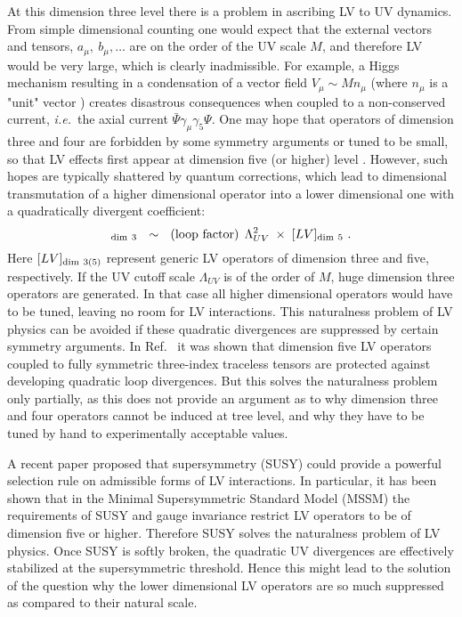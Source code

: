 \documentclass[12pt]{revtex4}
\begin{document}
At this dimension three level there is a problem in ascribing LV to UV
dynamics. From simple dimensional counting  one would expect that the
external vectors and tensors, $a_\mu,~b_\mu,\ldots$ are on the order
of the UV scale $M$, and therefore LV would be very large, which is clearly
inadmissible. For example, a Higgs mechanism resulting in a
condensation of a vector field $V_{\mu}\sim M n_\mu$ (where $n_\mu$ is a 
"unit" vector \cite{Kostelecky:1989jw}) creates disastrous
consequences when coupled to a non-conserved current, 
{\em i.e.}\ the axial current $\bar \Psi \gamma_\mu\gamma_5 \Psi$.  
One may hope that operators of dimension three and four are forbidden by 
some symmetry arguments or tuned to be small, so that LV effects 
first appear at dimension five (or higher) level \cite{MP:}. 
However, such hopes are typically shattered by quantum corrections, which
lead to dimensional transmutation of a higher dimensional operator into
a lower dimensional one with a quadratically divergent coefficient: 
%
\begin{equation}
[LV]_{\rm dim~3} ~~\sim~~ ({\rm loop~factor}) \, 
\;\Lambda_{UV}^2\;
\times\; [LV]_{{\rm dim}~5}~. 
\label{transmute}
\end{equation}
%
Here $[LV]_{\rm dim~3(5)}$ represent generic LV operators of dimension
three and five, respectively. If the UV cutoff scale $\Lambda_{UV}$ is
of the order of $M$, huge dimension three operators are generated. In
that case all higher dimensional operators would have to be tuned,
leaving no room for LV interactions. This naturalness problem of LV
physics can be avoided if these quadratic divergences are suppressed
by certain symmetry arguments. In Ref.~\cite{MP:} it was shown that
dimension five LV operators coupled to fully symmetric three-index
traceless tensors are protected against developing quadratic loop 
divergences. But this solves the naturalness problem only partially, as
this does not provide an argument as to why dimension three and four
operators cannot be induced at tree level, and why they have to be
tuned by hand to experimentally acceptable values.  


A recent paper \cite{GrootNibbelink:2004za} proposed that
supersymmetry (SUSY) could provide a powerful selection rule on
admissible forms of LV interactions. In particular, it has been shown
that in the Minimal Supersymmetric Standard Model (MSSM) the
requirements of SUSY and gauge invariance restrict LV operators to be
of dimension five or higher. Therefore SUSY solves the naturalness
problem of LV physics. Once SUSY is softly broken, the quadratic UV
divergences are effectively stabilized at  the supersymmetric
threshold. Hence this might lead to the solution of the question 
why the lower dimensional LV operators are so much suppressed as
compared to their natural scale. 
\end{document}
